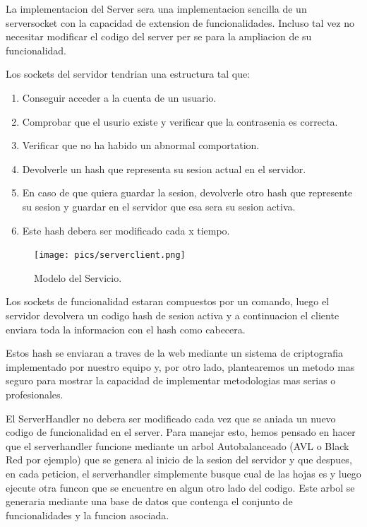 \documentclass{article}
\theoremstyle{definition}
\begin{document}
La implementacion del Server sera una implementacion sencilla de un serversocket con la capacidad de extension de funcionalidades. Incluso tal vez no necesitar modificar el codigo del server per se para la ampliacion de su funcionalidad. 

Los sockets del servidor tendrian una estructura tal que:
\begin{enumerate}
    \item Conseguir acceder a la cuenta de un usuario.
    \item Comprobar que el usurio existe y verificar que la contrasenia es correcta.
    \item Verificar que no ha habido un abnormal comportation.
    \item Devolverle un hash que representa su sesion actual en el servidor.
    \item En caso de que quiera guardar la sesion, devolverle otro hash que represente su sesion y guardar en el servidor que esa sera su sesion activa.
    \item Este hash debera ser modificado cada x tiempo.
\end{enumerate}

\begin{figure}
\centering
\texttt{[image: pics/serverclient.png]}
\caption{Modelo del Servicio.}
\end{figure} 

Los sockets de funcionalidad estaran compuestos por un comando, luego el servidor devolvera un codigo hash de sesion activa y a continuacion el cliente enviara toda la informacion con el hash como cabecera.

Estos hash se enviaran a traves de la web mediante un sistema de criptografia implementado por nuestro equipo y, por otro lado, plantearemos un metodo mas seguro para mostrar la capacidad de implementar metodologias mas serias o profesionales.

El ServerHandler no debera ser modificado cada vez que se aniada un nuevo codigo de funcionalidad en el server. Para manejar esto, hemos pensado en hacer que el serverhandler funcione mediante un arbol Autobalanceado (AVL o Black Red por ejemplo) que se genera al inicio de la sesion del servidor y que despues, en cada peticion, el serverhandler simplemente busque cual de las hojas es y luego ejecute otra funcon que se encuentre en algun otro lado del codigo. Este arbol se generaria mediante una base de datos que contenga el conjunto de funcionalidades y la funcion asociada.
\end{document}
